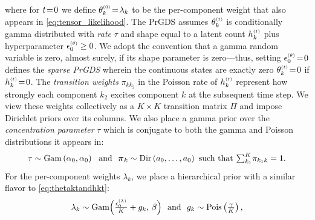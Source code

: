 \documentclass{article}
\begin{document}
where for $t\!=\! 0$ we define $\theta^{\mathsmaller{(0)}}_k \teq \lambda_k$ to be the per-component weight that also appears in \cref{eq:tensor_likelihood}. The PrGDS assumes $\thetakt$ is conditionally gamma distributed with \emph{rate} $\tau$ and shape equal to a latent count $\hkt$ plus hyperparameter $\epstheta \geq 0$. We adopt the convention that a gamma random variable is zero, almost surely, if its shape parameter is zero---thus, setting $\epstheta \teq 0$ defines the \emph{sparse PrGDS} wherein the continuous states are exactly zero $\thetakt \teq 0$ if $\hkt \teq 0$. The \emph{transition weights} $\pi_{kk_2}$ in the Poisson rate of $\hkt$ represent how strongly each component $k_2$ excites component $k$ at the subsequent time step. We view these weights collectively as a $K \!\times\! K$ transition matrix $\Pi$ and impose Dirichlet priors over its columns. We also place a gamma prior over the \emph{concentration parameter} $\tau$ which is conjugate to both the gamma and Poisson distributions it appears in:~
\begin{equation}
\tau \sim \Gam{\alpha_0, \alpha_0} \,\,\textrm{ and }\,\,
\boldsymbol{\pi}_k \sim \textrm{Dir}\left(a_0,\dots,a_0\right) \textrm{ such that }\mathsmaller{\sum_{k_1}}^K \pi_{k_1k}=1.
\end{equation}
For the per-component weights $\lambda_k$, we place a hierarchical prior with a similar flavor to \cref{eq:thetaktandhkt}:~ 
\begin{equation}
\label{eq:lambdakandgk}
\lambda_k \sim \textrm{Gam}\Big(\tfrac{\epslambda}{K} + g_k,\, \beta\Big) \,\,\textrm{ and }\,\,g_k \sim \Pois{\tfrac{\gamma}{K}},
% 
\end{equation}
\end{document}
